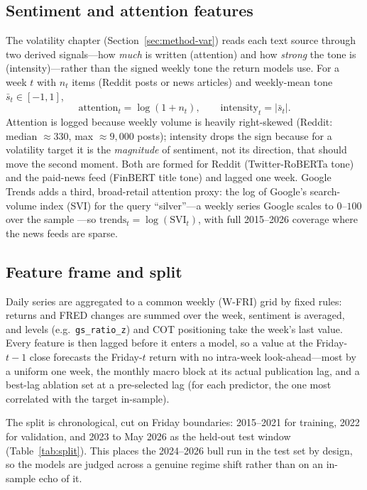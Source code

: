 \documentclass[12pt, a4paper]{article}
\begin{document}
\subsection{Sentiment and attention features}
\label{sec:data-sentiment}

The volatility chapter (Section~\ref{sec:method-var}) reads each text source through two
derived signals---how \emph{much} is written (attention) and how \emph{strong} the tone is
(intensity)---rather than the signed weekly tone the return models use. For a week \(t\) with
\(n_t\) items (Reddit posts or news articles) and weekly-mean tone \(\bar s_t \in [-1,1]\),
\begin{equation}
    \text{attention}_t = \log\!\left(1 + n_t\right), \qquad
    \text{intensity}_t = \lvert \bar s_t \rvert .
    \label{eq:attn-int}
\end{equation}
Attention is logged because weekly volume is heavily right-skewed (Reddit: median \(\approx
330\), max \(\approx 9{,}000\) posts); intensity drops the sign because for a volatility
target it is the \emph{magnitude} of sentiment, not its direction, that should move the
second moment. Both are formed for Reddit (Twitter-RoBERTa tone) and the paid-news feed
(FinBERT title tone) and lagged one week. Google Trends adds a third, broad-retail attention
proxy: the log of Google's search-volume index (SVI) for the query ``silver''---a weekly
series Google scales to \(0\)--\(100\) over the sample \parencite{da2011}---so
\(\text{trends}_t = \log(\mathrm{SVI}_t)\), with full 2015--2026 coverage where the news
feeds are sparse.

\subsection{Feature frame and split}
\label{sec:data-frame}

Daily series are aggregated to a common weekly (W-FRI) grid by fixed rules: returns and
FRED changes are summed over the week, sentiment is averaged, and levels (e.g.\
\texttt{gs\_ratio\_z}) and COT positioning take the week's last value. Every feature is then
lagged before it enters a model, so a value at the Friday-\(t{-}1\) close forecasts the
Friday-\(t\) return with no intra-week look-ahead---most by a uniform one week, the monthly
macro block at its actual publication lag, and a best-lag ablation set at a pre-selected lag
(for each predictor, the one most correlated with the target in-sample).

The split is chronological, cut on Friday boundaries: 2015--2021 for training, 2022 for
validation, and 2023 to May 2026 as the held-out test window (Table~\ref{tab:split}). This
places the 2024--2026 bull run in the test set by design, so the models are judged across a
genuine regime shift rather than on an in-sample echo of it.
\end{document}
